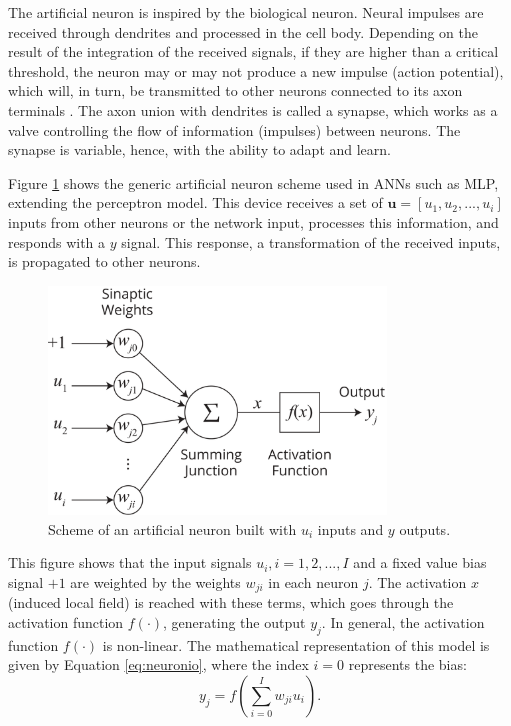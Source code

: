 The artificial neuron is inspired by the biological neuron. Neural impulses are received through dendrites and processed in the cell body. Depending on the result of the integration of the received signals, if they are %
higher than
a critical threshold, the neuron may or may not produce a new impulse (action potential), which will, in turn, be transmitted to other neurons connected to its axon terminals \cite{Castro2006FundamentalsON}. The axon union with dendrites is called a synapse, which works as a valve controlling the flow of information (impulses) between neurons. The synapse is variable, hence,
with
the ability to adapt and learn.

Figure \ref{fig:neuronio} shows the generic artificial neuron scheme used in ANNs such as MLP, extending the perceptron model. This device receives a set of $\textbf{u} = [ u_1 , u_2 ,..., u_i]$ inputs from other neurons or the network input, processes this information, and responds with a $y$ signal. This response, a transformation of the received inputs, is propagated to other neurons.

\begin{figure}[h!]
	\caption{Scheme of an artificial neuron built with $u_i$ inputs and $y$ outputs.}
	\vspace{0.2cm}
	\begin{center}
		\includegraphics[width=0.8\textwidth]{"Part 3 - Learning Systems/Supervised Learning/Multilayer Perceptron/neuronioArtificial.png"}
	\end{center}
	\label{fig:neuronio}
\end{figure}

This figure shows that the input signals $u_i , i=1, 2,..., I$ and a fixed value bias signal $+1$ are weighted by the weights $w_{ji}$ in each neuron $j$. The activation $x$ (induced local field) is reached with these terms, which goes through the activation function $f(\cdot)$, generating the output $y_j$. In general, the activation function $f(\cdot)$ is non-linear. The mathematical representation of this model is given by Equation \ref{eq:neuronio}, %
where
the index $i=0$ represents the bias:
\begin{equation}
    \label{eq:neuronio}
    y_j = f \left( \sum_{i=0}^I w_{ji} u_i  \right).
\end{equation}

